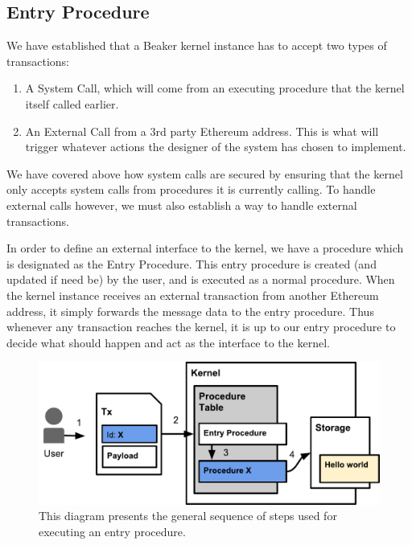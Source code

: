 \documentclass[english,a4paper]{article}
\begin{document}
\subsection{Entry Procedure}\label{entry-procedure}

We have established that a Beaker kernel instance has to accept two
types of transactions:

\begin{enumerate}
\def\labelenumi{\arabic{enumi}.}
\item
  A System Call, which will come from an executing procedure that the
  kernel itself called earlier.
\item
  An External Call from a 3rd party Ethereum address. This is what will
  trigger whatever actions the designer of the system has chosen to
  implement.
\end{enumerate}

We have covered above how system calls are secured by ensuring that the
kernel only accepts system calls from procedures it is currently
calling. To handle external calls however, we must also establish a way
to handle external transactions.

In order to define an external interface to the kernel, we have a
procedure which is designated as the Entry Procedure. This entry
procedure is created (and updated if need be) by the user, and is
executed as a normal procedure. When the kernel instance receives an
external transaction from another Ethereum address, it simply forwards
the message data to the entry procedure. Thus whenever any transaction
reaches the kernel, it is up to our entry procedure to decide what
should happen and act as the interface to the kernel.

\begin{figure}[htbp]
\centering
\includegraphics[width=1\textwidth]{media/EntryProcedure.pdf}
\caption{This diagram presents the general sequence of steps used
for executing an entry procedure.}
\end{figure}
\end{document}
